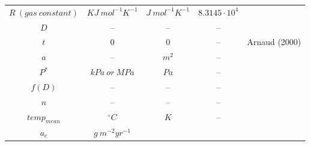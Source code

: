\documentclass[a4paper,11pt]{article}
\begin{document}
\begin{longtable}{|c|c|c|c|c|}
\begin{math} R \: (gas \: constant)\end{math} &
\begin{math} KJ \: {mol}^{-1} K^{-1} \end{math} &
\begin{math} J \: {mol}^{-1} K^{-1} \end{math} &
\begin{math} 8.3145 \cdot 10^4 \end{math} & \\
\cline{1-4}
\begin{math} D \end{math} &
-- &
-- &
-- & \\
\cline{1-4}
\begin{math} t \end{math} &
0 &
0 &
-- & 
Arnaud (2000) \cite{Arnaud:2000fk}\\
\cline{1-4}
\begin{math} a \end{math} &
-- &
\begin{math} m^2 \end{math} &
-- & \\
\cline{1-4}
\begin{math} P^* \end{math} &
\begin{math} kPa \: or \: MPa \end{math} &
\begin{math} Pa \end{math} &
-- & \\
\cline{1-4}
\begin{math} f(D) \end{math} &
-- &
-- &
-- & \\
\cline{1-4}
\begin{math} n \end{math} &
-- &
-- &
-- & \\
\cline{1-4}
\begin{math} temp_{mean}\end{math} &
\begin{math} ^\circ C\end{math} &
\begin{math} K \end{math} &
-- & \\
\cline{1-4}
\begin{math} a_c\end{math} &
\begin{math} g \: m^{-2} yr^{-1}\end{math} &

\end{longtable}
\end{document}
